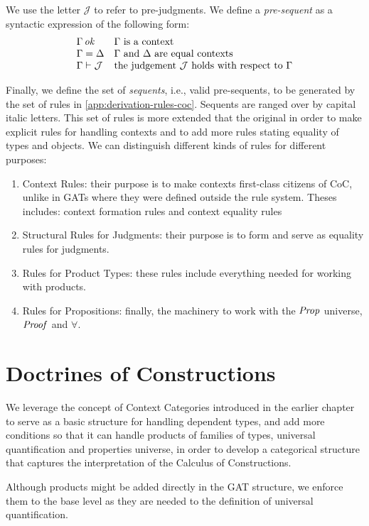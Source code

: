 We use the letter $\mathcal{J}$ to refer to pre-judgments.
We define a \textit{pre-sequent} as a syntactic expression of the following form:
\[
\begin{array}{ll}
    \Gamma \operatorname{\mathit{\space ok}} & \Gamma \text{ is a context} \\
    \Gamma = \Delta & \Gamma \text{ and } \Delta \text{ are equal contexts} \\
    \Gamma \vdash \mathcal{J} & \text{the judgement } \mathcal{J} \text{ holds with respect to } \Gamma
\end{array}
\]


Finally, we define the set of \textit{sequents}, i.e., valid pre-sequents, 
to be generated by the set of rules in \ref{app:derivation-rules-coc}. 
Sequents are ranged over by capital italic letters.
This set of rules is more extended that the original in order to make explicit rules for 
handling contexts and to add more rules stating equality of types and objects.
We can distinguish different kinds of rules for different purposes:
\begin{enumerate}
    \item Context Rules: their purpose is to make contexts first-class citizens of CoC, unlike in GATs where they were defined outside the rule system.
        Theses includes: context formation rules and context equality rules
    \item Structural Rules for Judgments: their purpose is to form and serve as equality rules for judgments.
    \item Rules for Product Types: these rules include everything needed for working with products.
    \item Rules for Propositions: finally, the machinery to work with the $\operatorname{\mathit{Prop}}$ universe, $\operatorname{\mathit{Proof}}$ and $\forall$.
\end{enumerate}

\section{Doctrines of Constructions}

We leverage the concept of Context Categories introduced in the earlier chapter
to serve as a basic structure for handling dependent types, and add more conditions
so that it can handle products of families of types, universal quantification and properties universe, in
order to develop a categorical structure that captures the interpretation of the
Calculus of Constructions.

Although products might be added directly in the GAT structure, we enforce them to the base level as
they are needed to the definition of universal quantification.


